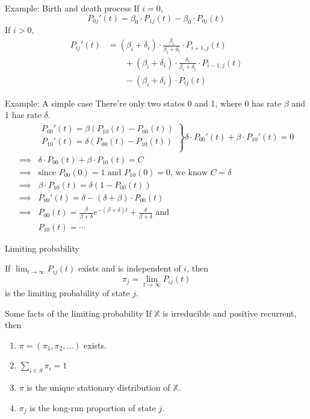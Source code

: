 \documentclass[mathserif]{beamer}
\begin{document}
\begin{frame}{Example: Birth and death process}
If $i = 0$,
\[
{P_{0j}}'(t) = \beta_0\cdot P_{1j}(t) - \beta_0\cdot P_{0j}(t)
\]
If $i > 0$,
\begin{align*}
{P_{ij}}'(t) & = (\beta_i + \delta_i)\cdot \frac{\beta_i}{\beta_i + \delta_i}\cdot P_{i+1,j}(t) \\
& \qquad + (\beta_i + \delta_i)\cdot \frac{\delta_i}{\beta_i + \delta_i}\cdot P_{i-1,j}(t) \\
& \qquad - (\beta_i + \delta_i)\cdot P_{ij}(t)
\end{align*}
\end{frame}

\begin{frame}{Example: A simple case}
There're only two states 0 and 1, where 0 has rate $\beta$ and 1 has rate $\delta$.
\begin{align*}
& \left.
\begin{array}{l}
{P_{00}}'(t) = \beta (P_{10}(t) - P_{00}(t)) \\
{P_{10}}'(t) = \delta (P_{00}(t) - P_{10}(t)) \\
\end{array}
\right\} \delta\cdot {P_{00}}'(t) + \beta\cdot {P_{10}}'(t) = 0 \\
\implies & \delta\cdot P_{00}(t) + \beta\cdot P_{10}(t) = C \\
\implies & \text{since $P_{00}(0) = 1$ and $P_{10}(0) = 0$, we know } C = \delta \\
\implies & \beta\cdot P_{10}(t) = \delta(1 - P_{00}(t)) \\
\implies & {P_{00}}'(t) = \delta - (\delta + \beta)\cdot P_{00}(t) \\
\implies & P_{00}(t) = \frac{\beta}{\beta + \delta} e^{-(\beta + \delta)t}
 + \frac{\delta}{\beta + \delta} \text{ and} \\
& P_{10}(t) = \cdots
\end{align*}
\end{frame}

\begin{frame}{Limiting probability}
\begin{definition}
If $\lim_{t\to\infty} P_{ij}(t)$ exists and is independent of $i$, then
\[
\pi_j = \lim_{t\to\infty} P_{ij}(t)
\]
is the limiting probability of state $j$.
\end{definition}
\end{frame}

\begin{frame}{Some facts of the limiting probability}
If $\mathbb{X}$ is irreducible and positive recurrent, then
\begin{enumerate}
\item $\pi = (\pi_1, \pi_2, \ldots)$ exists.
\item $\sum_{i\in S} \pi_i = 1$
\item $\pi$ is the unique stationary distribution of $\mathbb{X}$.
\item $\pi_j$ is the long-run proportion of state $j$.
\end{enumerate}
\end{frame}
\end{document}

